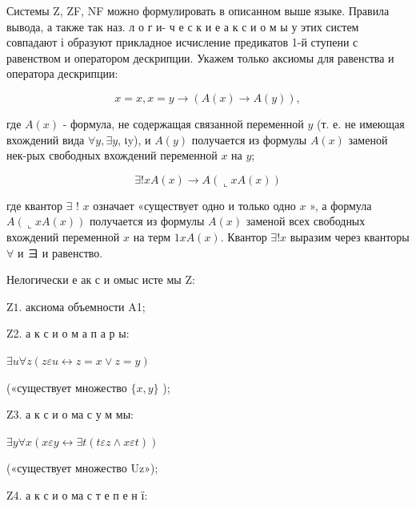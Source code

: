 \documentclass[10pt]{article}
\begin{document}
Системы Z, ZF, NF можно формулировать в описанном выше языке. Правила вывода, а также так наз. л о г и- ч е с к и е а к с и о м ы у этих систем совпадают і образуют прикладное исчисление предикатов 1-й ступени с равенством и оператором дескрипции. Укажем только аксиомы для равенства и оператора дескрипции:



\[

x=x, x=y \longrightarrow(A(x) \longrightarrow A(y)),

\]



где $A(x)$ - формула, не содержащая связанной переменной $y$ (т. е. не имеющая вхождений вида $\forall y, \exists y$, เy), и $A(y)$ получается из формулы $A(x)$ заменой нек-рых свободных вхождений переменной $x$ на $y$;



\[

\exists ! x A(x) \longrightarrow A(\llcorner x A(x))

\]



где квантор $\exists$ ! $x$ означает «существует одно и только одно $x$ », а формула $A(\llcorner x A(x))$ получается из формулы $A(x)$ заменой всех свободных вхождений переменной $x$ на терм $1 x A(x)$. Квантор $\exists ! x$ выразим через кванторы $\forall$ и $ヨ$ и равенство.



Нелогически е ак с и омыс исте мы Z:



$\mathrm{Z} 1$. аксиома объемности A1;



Z2. а к с и о м а п а р ы:



$\exists u \forall z(z \varepsilon u \leftrightarrow z=x \vee z=y)$



(«существует множество $\{x, y\}$ );



Z3. а к с и о ма с у м мы:



$\exists y \forall x(x \varepsilon y \leftrightarrow \exists t(t \varepsilon z \wedge x \varepsilon t))$



(«существует множество Uz»);



Z4. а к с и о ма с т е п е н ї:
\end{document}
